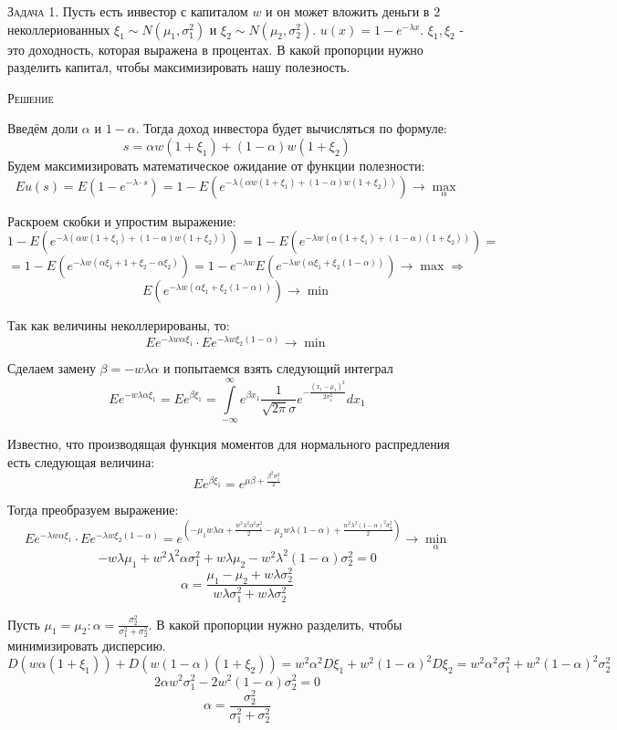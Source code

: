 \documentclass[%
12pt, %
final, %
oneside, %
onecolumn, %
centertags]{article} %
\theoremstyle{plain}
\theoremstyle{definition}
\theoremstyle{remark}
\begin{document}
\textsc{Задача 1.}
Пусть есть инвестор с капиталом $w$ и он может вложить деньги в $2$ неколлериованных $\xi_1 \sim N(\mu_1,\sigma_1^2)$ и $\xi_2 \sim N(\mu_2,\sigma_2^2)$. $u(x) = 1 - e^{-\lambda x}$. $\xi_1,\xi_2$ - это доходность, которая выражена в процентах.  В какой пропорции нужно разделить капитал, чтобы максимизировать нашу полезность.

\textsc{Решение}

Введём доли $\alpha$ и $1-\alpha$. Тогда доход инвестора будет вычисляться по формуле:
$$s = \alpha w (1+\xi_1) + (1-\alpha)w(1+\xi_2)$$
Будем максимизировать математическое ожидание от функции полезности:
$$Eu(s) = E (1-e^{-\lambda \cdot s}) = 1 - E \left(e^{-\lambda \left(\alpha w (1+\xi_1) + (1-\alpha)w(1+\xi_2)\right)}\right) \to \underset{\alpha}{\max}$$

Раскроем скобки и упростим выражение:
$$1 - E \left(e^{-\lambda \left(\alpha w (1+\xi_1) + (1-\alpha)w(1+\xi_2)\right)}\right) = 1 - E \left(e^{-\lambda w \left(\alpha(1+\xi_1) + (1-\alpha)(1+\xi_2)\right)}\right) = $$
$$ = 1 - E\left(e^{-\lambda w (\alpha\xi_1 + 1 + \xi_2 - \alpha \xi_2)}\right) = 1 - e^{-\lambda w}E\left(e^{-\lambda w (\alpha \xi_1 + \xi_2 (1-\alpha))}\right) \to \max \Rightarrow$$
$$E\left(e^{-\lambda w (\alpha \xi_1 + \xi_2 (1-\alpha))}\right) \to \min$$

Так как величины неколлерированы, то:
$$Ee^{-\lambda w \alpha \xi_1} \cdot Ee^{-\lambda w \xi_2 (1-\alpha)} \to \min$$

Сделаем замену $\beta = -w\lambda\alpha$ и попытаемся взять следующий интеграл
$$Ee^{-w\lambda\alpha\xi_1} = Ee^{\beta \xi_1} = \int\limits_{-\infty}^{\infty} e^{\beta x_1}\frac{1}{\sqrt{2\pi}\sigma}e^{-\frac{(x_1-\mu_1)^2}{2\sigma_1^2}}dx_1$$

Известно, что производящая функция моментов для нормального распредления есть следующая величина:
$$Ee^{\beta \xi_1} = e^{\mu\beta + \frac{\beta^2 \sigma_1^2}{2}}$$

Тогда преобразуем выражение:
$$Ee^{-\lambda w \alpha \xi_1} \cdot Ee^{-\lambda w \xi_2 (1-\alpha)} = e^{\left(-\mu_1w\lambda\alpha + \frac{w^2 \lambda^2\alpha^2 \sigma_1^2}{2}-\mu_2w\lambda(1-\alpha) + \frac{w^2 \lambda^2(1-\alpha)^2 \sigma_2^2}{2}\right)} \to \underset{\alpha}{\min}$$
$$-w\lambda\mu_1 + w^2\lambda^2\alpha\sigma_1^2 + w\lambda\mu_2-w^2\lambda^2(1-\alpha)\sigma_2^2 = 0$$
$$\alpha = \frac{\mu_1-\mu_2+w\lambda\sigma_2^2}{w\lambda\sigma_1^2+w\lambda\sigma_2^2}$$

Пусть $\mu_1=\mu_2: \alpha = \frac{\sigma_2^2}{\sigma_1^2+\sigma_2^2}$. В какой пропорции нужно разделить, чтобы минимизировать дисперсию.
$$D(w\alpha(1+\xi_1))+D(w(1-\alpha)(1+\xi_2)) = w^2 \alpha^2 D\xi_1 + w^2 (1-\alpha)^2 D\xi_2 = w^2\alpha^2\sigma_1^2 + w^2(1-\alpha)^2\sigma_2^2$$
$$2\alpha w^2\sigma_1^2 -2w^2(1-\alpha)\sigma_2^2 = 0$$
$$\alpha = \frac{\sigma_2^2}{\sigma_1^2+\sigma_2^2}$$
\end{document}

